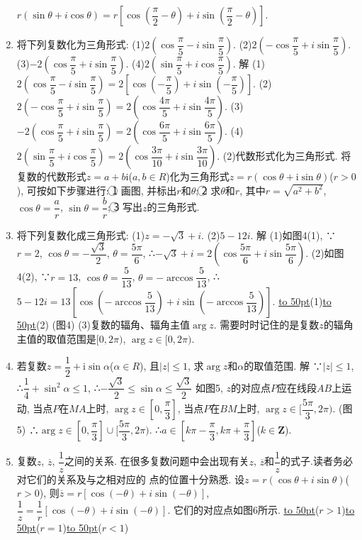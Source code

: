 \documentclass[10pt,a4paper]{article}
\newcommand{\blank}[1]{\underline{\hbox to #1pt{}}}
\begin{document}
\begin{enumerate}[1.]
$r(\sin \theta +i\cos \theta)=r[\cos (\dfrac{\pi }2-\theta)+i\sin (\dfrac{\pi }2-\theta)]$.
\item 将下列复数化为三角形式:
(1)$2(\cos \dfrac{\pi }5-i\sin \dfrac{\pi }5)$.					(2)$2(-\cos \dfrac{\pi }5+i\sin \dfrac{\pi }5)$.
(3)$-2(\cos \dfrac{\pi }5+i\sin \dfrac{\pi }5)$.					(4)$2(\sin \dfrac{\pi }5+i\cos \dfrac{\pi }5)$.
解  (1)$2(\cos \dfrac{\pi }5-i\sin \dfrac{\pi }5)=2[\cos (-\dfrac{\pi }5)+i\sin (-\dfrac{\pi }5)]$.
(2)$2(-\cos \dfrac{\pi }5+i\sin \dfrac{\pi }5)=2(\cos \dfrac{4\pi }5+i\sin \dfrac{4\pi }5)$.
(3)$-2(\cos \dfrac{\pi }5+i\sin \dfrac{\pi }5)=2(\cos \dfrac{6\pi }5+i\sin \dfrac{6\pi }5)$.
(4)$2(\sin \dfrac{\pi }5+i\cos \dfrac{\pi }5)=2(\cos \dfrac{3\pi }{10}+i\sin \dfrac{3\pi }{10})$.
(2)代数形式化为三角形式.
将复数的代数形式$z=a+b\mathrm{i}$($a,b\in R$)化为三角形式$z=r(\cos \theta +\mathrm{i}\sin \theta)$($r>0$), 可按如下步骤进行:
\textcircled{1} 画图, 并标出$r$和$\theta$;
\textcircled{2} 求$\theta$和$r$, 其中$r=\sqrt {a^2+b^2}$, $\cos \theta =\dfrac ar$, $\sin \theta =\dfrac br$;
\textcircled{3} 写出$z$的三角形式.
\item 将下列复数化成三角形式:
(1)$z=-\sqrt 3+i$.					(2)$5-12i$.
解  (1)如图4(1),
∵$r=2$, $\cos \theta =-\dfrac{\sqrt 3}2$, $\theta =\dfrac{5\pi }6$, ∴$-\sqrt 3+i=2(\cos \dfrac{5\pi }6+i\sin \dfrac{5\pi }6)$.
(2)如图4(2),
∵$r=13$, $\cos \theta =\dfrac 5{13}$, $\theta =-\arccos \dfrac 5{13}$,
∴$5-12i=13[\cos (-\arccos \dfrac 5{13})+i\sin (-\arccos \dfrac 5{13})]$.
\blank{50}(1)\blank{50}(2)
(图4)
(3)复数的辐角、辐角主值$\arg z$.
需要时时记住的是复数$z$的辐角主值的取值范围是$[0,2\pi)$, $\arg z\in [0,2\pi)$.
\item 若复数$z=\dfrac 12+\mathrm{i}\sin \alpha$($\alpha \in R$), 且$|z|\le 1$, 求$\arg z$和$\alpha$的取值范围.
解  ∵$|z|\le 1$, ∴$\dfrac 14+\sin ^2\alpha \le 1$, ∴$-\dfrac{\sqrt 3}2\le \sin \alpha \le \dfrac{\sqrt 3}2$
如图5, $z$的对应点$P$应在线段$AB$上运动, 当点$P$在$MA$上时, $\arg z\in [0,\dfrac{\pi }3]$, 当点$P$在$BM$上时, $\arg z\in [\dfrac{5\pi }3,2\pi)$.
(图5)
∴$\arg z\in [0,\dfrac{\pi }3]\cup [\dfrac{5\pi }3,2\pi)$.
∴$a\in [k\pi -\dfrac{\pi }3,k\pi +\dfrac{\pi }3]$($k\in \mathbf{Z}$).
\item 复数$z$, $\overline z$, $\dfrac 1z$之间的关系.
在很多复数问题中会出现有关$z$, $\overline z$和$\dfrac 1z$的式子.读者务必对它们的关系及与之相对应的
点的位置十分熟悉.
设$z=r(\cos \theta +i\sin \theta)$($r>0$), 则$\overline z=r[\cos (-\theta)+i\sin (-\theta)]$,
$\dfrac 1z=\dfrac 1r[\cos (-\theta)+i\sin (-\theta)]$.
它们的对应点如图6所示.
\blank{50}($r>1$)\blank{50}($r=1$)\blank{50}($r<1$)

\end{enumerate}
\end{document}
